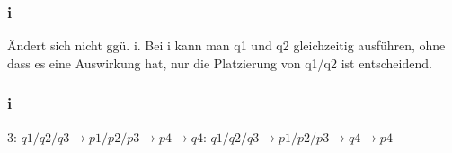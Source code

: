 \documentclass[12pt,pdftex,a4paper]{article}
\begin{document}
\subsubsection*{i}
 Ändert sich nicht ggü. i. Bei i kann man q1 und q2 gleichzeitig ausführen, ohne dass es eine Auswirkung hat, nur die Platzierung von q1/q2 ist entscheidend.\newline
 

\subsubsection*{i}
 3: $q1/q2/q3 \rightarrow p1/p2/p3 \rightarrow p4 \rightarrow q4$: $q1/q2/q3 \rightarrow p1/p2/p3 \rightarrow q4 \rightarrow p4$\newline
\end{document}
